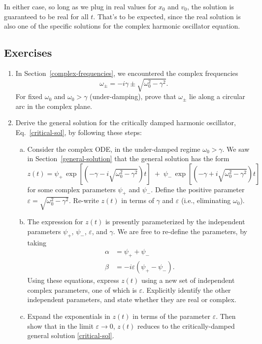 \documentclass[10pt,a4paper]{article}
\begin{document}
In either case, so long as we plug in real values for $x_0$ and $v_0$,
the solution is guaranteed to be real for all $t$. That's to be
expected, since the real solution is also one of the specific
solutions for the complex harmonic oscillator equation.

\subsection{Exercises}
\label{exercises}

\begin{enumerate}
\item
  In Section~\ref{complex-frequencies}, we encountered the complex
  frequencies
  \begin{equation}
    \omega_\pm = -i\gamma \pm \sqrt{\omega_0^2 - \gamma^2}.
  \end{equation}
  For fixed $\omega_0$ and $\omega_0 > \gamma$ (under-damping), prove
  that $\omega_\pm$ lie along a circular arc in the complex plane.

\item
  Derive the general solution for the critically damped harmonic
  oscillator, Eq.~\eqref{critical-sol}, by following these steps:
  \begin{enumerate}[(a)]
  \item
    Consider the complex ODE, in the under-damped regime $\omega_0 >
    \gamma$. We saw in Section~\ref{general-solution} that the general
    solution has the form
    \begin{equation}
      z(t) = \psi_+ \, \exp\left[\left(-\gamma  - i \sqrt{\omega_0^2 - \gamma^2}\right)t\right] \; +\; \psi_- \, \exp\left[\left(-\gamma +i\sqrt{\omega_0^2 - \gamma^2}\right)t\right]
    \end{equation}
    for some complex parameters $\psi_+$ and $\psi_-$. Define the
    positive parameter $\varepsilon = \sqrt{\omega_0^2 - \gamma^2}$.
    Re-write $z(t)$ in terms of $\gamma$ and $\varepsilon$ (i.e.,
    eliminating $\omega_0$).

  \item
    The expression for $z(t)$ is presently parameterized by the
    independent parameters $\psi_+$, $\psi_-$, $\varepsilon$, and
    $\gamma$. We are free to re-define the parameters, by taking
    \begin{align}
      \alpha &= \psi_+ + \psi_- \\
      \beta &= -i\varepsilon(\psi_+ - \psi_-).
    \end{align}
    Using these equations, express $z(t)$ using a new set of
    independent complex parameters, one of which is $\varepsilon$.
    Explicitly identify the other independent parameters, and state
    whether they are real or complex.
  \item
    Expand the exponentials in $z(t)$ in terms of the parameter
    $\varepsilon$. Then show that in the limit $\varepsilon
    \rightarrow 0$, $z(t)$ reduces to the critically-damped general
    solution \eqref{critical-sol}.
  \end{enumerate}


\end{enumerate}
\end{document}
